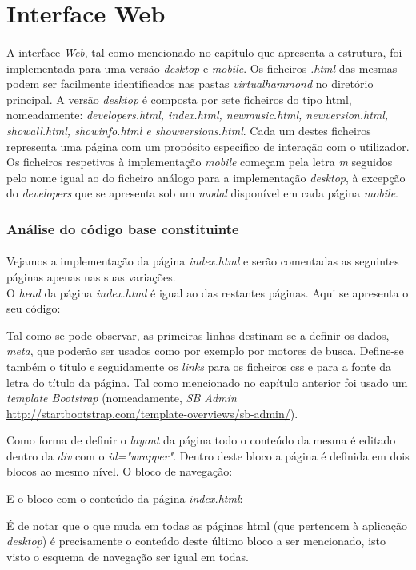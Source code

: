 \documentclass[11pt,openany,twoside]{report}
\begin{document}
\section{Interface Web}
\paragraph{ } A interface \textit{Web}, tal como mencionado no capítulo que apresenta a estrutura, foi implementada para uma versão \textit{desktop} e \textit{mobile}. Os ficheiros \textit{\*.html} das mesmas podem ser facilmente identificados nas pastas \textit{virtualhammond} no diretório principal. A versão \textit{desktop} é composta por sete ficheiros do tipo \acs{html}, nomeadamente: \textit{developers.html, index.html, newmusic.html, newversion.html, showall.html, showinfo.html e showversions.html}. Cada um destes ficheiros representa uma página com um propósito específico de interação com o utilizador. Os ficheiros respetivos à implementação \textit{mobile} começam pela letra \textit{m} seguidos pelo nome igual ao do ficheiro análogo para a implementação \textit{desktop}, à excepção do \textit{developers} que se apresenta sob um \textit{modal} disponível em cada página \textit{mobile}.

\subsubsection{Análise do código base constituinte}
\paragraph{ } Vejamos a implementação da página \textit{index.html} e serão comentadas as seguintes páginas apenas nas suas variações.\\

O \textit{head} da página \textit{index.html} é igual ao das restantes páginas. Aqui se apresenta o seu código: 

Tal como se pode observar, as primeiras linhas destinam-se a definir os dados, \textit{meta}, que poderão ser usados como por exemplo por motores de busca. Define-se também o título e seguidamente os \textit{links} para os ficheiros \acs{css} e para a fonte da letra do título da página. Tal como mencionado no capítulo anterior foi usado um \textit{template Bootstrap} (nomeadamente, \textit{SB Admin} \url{http://startbootstrap.com/template-overviews/sb-admin/}).

Como forma de definir o \textit{layout} da página todo o conteúdo da mesma é editado dentro da \textit{div} com o \textit{id="wrapper"}. Dentro deste bloco a página é definida em dois blocos ao mesmo nível. O bloco de navegação:

E o bloco com o conteúdo da página \textit{index.html}:

É de notar que o que muda em todas as páginas \acs{html} (que pertencem à aplicação \textit{desktop}) é precisamente o conteúdo deste último bloco a ser mencionado, isto visto o esquema de navegação ser igual em todas.
\end{document}
